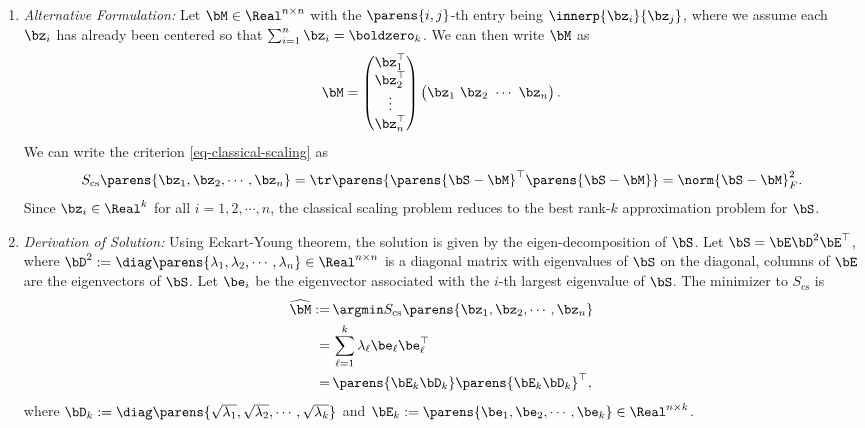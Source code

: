 \documentclass[12pt]{article}
\begin{document}
\begin{enumerate}[label=\textbf{\arabic*.}]
\begin{enumerate}
		\item \textit{Alternative Formulation:} Let $\bM \in \Real^{n \times n}$ with the $\parens{i, j}$-th entry being $\innerp{\bz_i}{\bz_j}$, where we assume each $\bz_i$ has already been centered so that $\sum_{i=1}^n \bz_i = \boldzero_k$. We can then write $\bM$ as 
		\begin{align*}
			\bM = \begin{pmatrix}
				\bz_1^\top \\ 
				\bz_2^\top \\ 
				\vdots \\ 
				\bz_n^\top \\
			\end{pmatrix} \begin{pmatrix}
				\bz_1  \ 
				\bz_2 \ 
				\cdots \ 
				\bz_n
			\end{pmatrix}. 
		\end{align*}
		We can write the criterion \eqref{eq-classical-scaling} as 
		\begin{align*}
			S_{\mathrm{cs}} \parens{\bz_1, \bz_2, \cdots, \bz_n} = \tr \parens{\parens{\bS - \bM}^\top \parens{\bS - \bM}} = \norm{\bS - \bM}_F^2. 
		\end{align*}
		Since $\bz_i \in \Real^k$ for all $i = 1, 2, \cdots, n$, the classical scaling problem reduces to the best rank-$k$ approximation problem for $\bS$. 
		
		\item \textit{Derivation of Solution:} Using Eckart-Young theorem, the solution is given by the eigen-decomposition of $\bS$. Let $\bS = \bE \bD^2 \bE^\top$, where $\bD^2 := \diag \parens{\lambda_1, \lambda_2, \cdots, \lambda_n} \in \Real^{n \times n}$ is a diagonal matrix with eigenvalues of $\bS$ on the diagonal, columns of $\bE$ are the eigenvectors of $\bS$. Let $\be_i$ be the eigenvector associated with the $i$-th largest eigenvalue of $\bS$. The minimizer to $S_{\mathrm{cs}}$ is 
		\begin{align*}
			\widehat{\bM} := & \, \argmin S_{\mathrm{cs}} \parens{\bz_1, \bz_2, \cdots, \bz_n} \\ 
			= & \, \sum_{\ell=1}^k \lambda_{\ell} \be_{\ell} \be_{\ell}^\top \\ 
			= & \, \parens{\bE_k \bD_k} \parens{\bE_k \bD_k}^\top, 
		\end{align*}
		where $\bD_k := \diag \parens{\sqrt{\lambda_1}, \sqrt{\lambda_2}, \cdots, \sqrt{\lambda_k}}$ and $\bE_k := \parens{\be_1, \be_2, \cdots, \be_k} \in \Real^{n \times k}$. 
		

\end{enumerate}
\end{enumerate}
\end{document}
